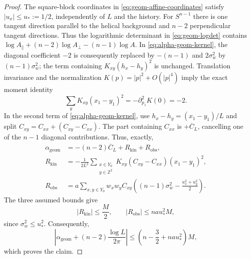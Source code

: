 \documentclass[11pt]{article}
\numberwithin{equation}{section}
\theoremstyle{definition}
\theoremstyle{plain}
\begin{document}
\begin{proof}
The square-block coordinates in \eqref{eq:geom-affine-coordinates}
satisfy $|u_x|\le u_*:=1/2$, independently of $L$ and the history.
For $S^{n-1}$ there is one tangent direction parallel to the
helical background and $n-2$ perpendicular tangent directions.
Thus the logarithmic determinant in \eqref{eq:geom-logdet}
contains $\log A_\parallel+(n-2)\log A_\perp-(n-1)\log A$.
In \eqref{eq:alpha-geom-kernel}, the diagonal coefficient $-2$
is consequently replaced by $-(n-1)$ and $2\sigma_w^2$ by
$(n-1)\sigma_w^2$; the term containing
$K_{xy}(h_x-h_y)^2$ is unchanged.
Translation invariance and the normalization
$K(p)=|p|^2+O(|p|^4)$ imply the exact moment identity
\begin{equation}
 \sum_y K_{xy}(x_1-y_1)^2
 =-\partial_{p_1}^2K(0)=-2.
 \label{eq:geom-kinetic-moment}
\end{equation}
In the second term of \eqref{eq:alpha-geom-kernel}, use
$h_x-h_y=(x_1-y_1)/L$ and split
$C_{xy}=C_{xx}+(C_{xy}-C_{xx})$.  The part containing $C_{xx}$
is $+\overline C_L$, cancelling one of the $n-1$ diagonal
contributions.  Thus, exactly,
\begin{align}
 \alpha_{\mathrm{geom}}
   &=-(n-2)\overline C_L+R_{\mathrm{kin}}+R_{\mathrm{obs}},
       \label{eq:geom-log-decomposition}\\
 R_{\mathrm{kin}}
   &=-\frac1{2L^2}\sum_{\substack{x\in Y_0\\y\in\mathbb Z^2}}
       K_{xy}(C_{xy}-C_{xx})(x_1-y_1)^2,\\
 R_{\mathrm{obs}}
   &=a\sum_{x,y\in Y_0}w_xw_yC_{xy}
          \left((n-1)\sigma_w^2-\frac{u_x^2+u_y^2}{2}\right).
\end{align}
The three assumed bounds give
\begin{equation}
 |R_{\mathrm{kin}}|\le\frac M2,\qquad
 |R_{\mathrm{obs}}|\le na u_*^2M,
\end{equation}
since $\sigma_w^2\le u_*^2$.  Consequently,
\begin{equation}
 \left|\alpha_{\mathrm{geom}}+(n-2)\frac{\log L}{2\pi}\right|
 \le \left(n-\frac32+na u_*^2\right)M,
\end{equation}
which proves the claim.
\end{proof}
\end{document}
